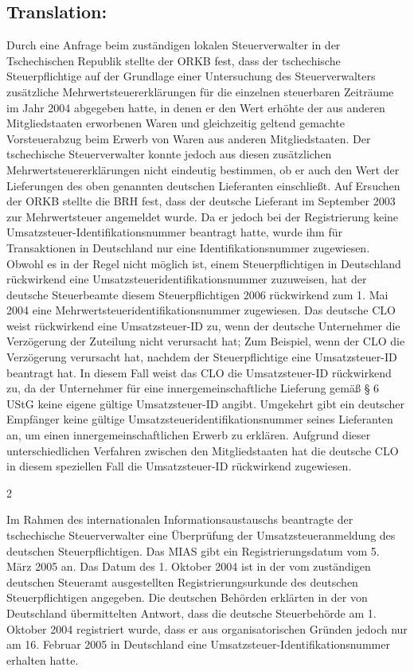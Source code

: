 \documentclass[10pt]{article}
\begin{document}
\subsection*{Translation:}

Durch eine Anfrage beim zuständigen lokalen Steuerverwalter in der Tschechischen Republik stellte der ORKB fest, dass der tschechische Steuerpflichtige auf der Grundlage einer Untersuchung des Steuerverwalters zusätzliche Mehrwertsteuererklärungen für die einzelnen steuerbaren Zeiträume im Jahr 2004 abgegeben hatte, in denen er den Wert erhöhte der aus anderen Mitgliedstaaten erworbenen Waren und gleichzeitig geltend gemachte Vorsteuerabzug beim Erwerb von Waren aus anderen Mitgliedstaaten.
Der tschechische Steuerverwalter konnte jedoch aus diesen zusätzlichen Mehrwertsteuererklärungen nicht eindeutig bestimmen, ob er auch den Wert der Lieferungen des oben genannten deutschen Lieferanten einschließt.
Auf Ersuchen der ORKB stellte die BRH fest, dass der deutsche Lieferant im September 2003 zur Mehrwertsteuer angemeldet wurde.
Da er jedoch bei der Registrierung keine Umsatzsteuer-Identifikationsnummer beantragt hatte, wurde ihm für Transaktionen in Deutschland nur eine Identifikationsnummer zugewiesen.
Obwohl es in der Regel nicht möglich ist, einem Steuerpflichtigen in Deutschland rückwirkend eine Umsatzsteueridentifikationsnummer zuzuweisen, hat der deutsche Steuerbeamte diesem Steuerpflichtigen 2006 rückwirkend zum 1. Mai 2004 eine Mehrwertsteueridentifikationsnummer zugewiesen.
Das deutsche CLO weist rückwirkend eine Umsatzsteuer-ID zu, wenn der deutsche Unternehmer die Verzögerung der Zuteilung nicht verursacht hat; Zum Beispiel, wenn der CLO die Verzögerung verursacht hat, nachdem der Steuerpflichtige eine Umsatzsteuer-ID beantragt hat.
In diesem Fall weist das CLO die Umsatzsteuer-ID rückwirkend zu, da der Unternehmer für eine innergemeinschaftliche Lieferung gemäß § 6 UStG keine eigene gültige Umsatzsteuer-ID angibt.
Umgekehrt gibt ein deutscher Empfänger keine gültige Umsatzsteueridentifikationsnummer seines Lieferanten an, um einen innergemeinschaftlichen Erwerb zu erklären.
Aufgrund dieser unterschiedlichen Verfahren zwischen den Mitgliedstaaten hat die deutsche CLO in diesem speziellen Fall die Umsatzsteuer-ID rückwirkend zugewiesen.


2

Im Rahmen des internationalen Informationsaustauschs beantragte der tschechische Steuerverwalter eine Überprüfung der Umsatzsteueranmeldung des deutschen Steuerpflichtigen.
Das MIAS gibt ein Registrierungsdatum vom 5. März 2005 an. Das Datum des 1. Oktober 2004 ist in der vom zuständigen deutschen Steueramt ausgestellten Registrierungsurkunde des deutschen Steuerpflichtigen angegeben.
Die deutschen Behörden erklärten in der von Deutschland übermittelten Antwort, dass die deutsche Steuerbehörde am 1. Oktober 2004 registriert wurde, dass er aus organisatorischen Gründen jedoch nur am 16. Februar 2005 in Deutschland eine Umsatzsteuer-Identifikationsnummer erhalten hatte.
\end{document}
